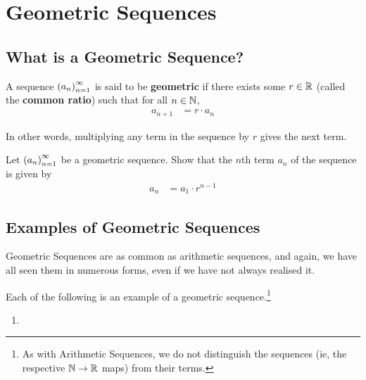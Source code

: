 \section{Geometric Sequences}

\subsection{What is a Geometric Sequence?}

\begin{definition}
    A sequence $\left( a_n \right)_{n=1}^{\infty}$ is said to be \textbf{geometric} if there exists some $r \in \mathbb{R}$ (called the \textbf{common ratio}) such that for all $n \in \mathbb{N}$,
    \begin{align}
        a_{n+1} &= r \cdot a_n
    \end{align}
\end{definition}
In other words, multiplying any term in the sequence by $r$ gives the next term.

\begin{boxexercise}
    Let $\left( a_n \right)_{n=1}^{\infty}$ be a geometric sequence. Show that the $n$th term $a_n$ of the sequence is given by
    \begin{align}
        a_n &= a_1 \cdot r^{n - 1}
    \end{align}
\end{boxexercise}

\subsection{Examples of Geometric Sequences}

Geometric Sequences are as common as arithmetic sequences, and again, we have all seen them in numerous forms, even if we have not always realised it.

\begin{example}
    Each of the following is an example of a geometric sequence.\footnote{As with Arithmetic Sequences, we do not distinguish the sequences (ie, the respective $\mathbb{N} \to \mathbb{R}$ maps) from their terms.}
    \begin{enumerate}
        \item 
    \end{enumerate}
\end{example}

